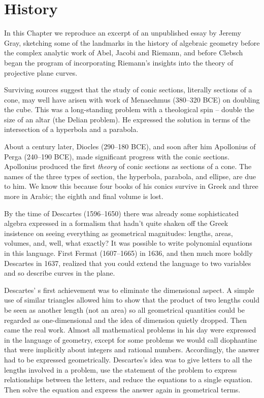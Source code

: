 

\chapter{History} 
\label{History}

In this Chapter we reproduce an excerpt of an unpublished essay by Jeremy Gray, sketching some of the landmarks in the history of algebraic geometry before the complex analytic work of
Abel, Jacobi and Riemann, and before Clebsch began the program of incorporating Riemann's insights into the theory of projective plane curves.

Surviving sources suggest that the study of conic sections, literally sections of a cone, may well have arisen with work of Menaechmus (380--320 BCE) on doubling the cube. This was a long-standing problem with a theological spin -- double the size of an altar (the Delian problem).  He expressed the solution in terms of the intersection
of a hyperbola and a parabola. 

About a century later, Diocles (290--180 BCE), and soon after him Apollonius of Perga (240--190 BCE), made significant progress with the conic sections.
Apollonius produced the first \emph{theory} of conic sections as sections of a cone. The names of the three types of section, the hyperbola, parabola, and ellipse,  are due to him.
We know this because four books of his conics survive in Greek and three more in Arabic; the eighth and final volume is lost. 

By the time of Descartes (1596--1650) there was already some sophisticated algebra expressed in a formalism that hadn't quite shaken off the Greek insistence on seeing everything as geometrical magnitudes: lengths, areas, volumes, and, well, what exactly? It was possible to write polynomial equations in this language. First Fermat (1607--1665) in 1636, and then much more boldly Descartes in 1637, realized that you could extend the language to two variables and so describe curves in the plane.

Descartes' s first achievement was to eliminate the dimensional aspect. A simple use of similar triangles allowed him to show that the product of two lengths could be seen as another length (not an area) so all geometrical quantities could be regarded as one-dimensional and the idea of dimension quietly dropped. Then came the real work. Almost all mathematical problems in his day were expressed in the language of geometry, except for some problems we would call diophantine that were implicitly about integers and rational numbers. Accordingly, the answer had to be expressed geometrically. Descartes's idea was to give letters to all the lengths involved in a problem, use the statement of the problem to express relationships between the letters, and reduce the equations to a single equation. Then solve the equation and express the answer again in geometrical terms.  

